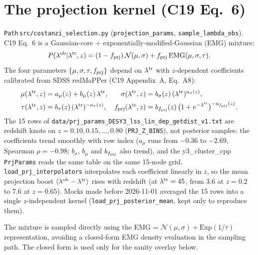 \documentclass[a4paper, 11pt]{article}
\newcommand{\lob}{\lambda^{\rm ob}}
\newcommand{\ltr}{\lambda^{\rm tr}}
\newcommand{\modname}[1]{\textcolor{kwcol}{\texttt{#1}}}
\newcommand{\pyfile}[1]{{\small\texttt{#1}}}
\begin{document}
\section{The projection kernel (C19 Eq.~6)}
\label{sec:projection}

\modname{Path}\,\pyfile{src/costanzi\_selection.py}
(\texttt{projection\_params}, \texttt{sample\_lambda\_obs}). C19 Eq.~6 is a
Gaussian-core $+$ exponentially-modified-Gaussian (EMG) mixture:
\begin{equation}
\label{eq:c19-eq6}
  P(\lob | \ltr, z)
  = (1 - f_{\rm prj})\, \mathcal N(\mu, \sigma)
       + f_{\rm prj}\, \mathrm{EMG}(\mu, \sigma, \tau).
\end{equation}
The four parameters $\{\mu, \sigma, \tau, f_{\rm prj}\}$ depend on
$\ltr$ with $z$-dependent coefficients calibrated from SDSS redMaPPer
(C19 Appendix~A, Eq.~A8):
\begin{equation}
\label{eq:c19-a8}
\begin{aligned}
  \mu(\ltr, z)         &= a_\mu(z) + b_\mu(z)\,\ltr,
  & \sigma(\ltr, z)     &= b_\sigma(z)\,(\ltr)^{a_\sigma(z)}, \\
  \tau(\ltr, z)        &= b_\tau(z)\,(\ltr)^{-a_\tau(z)},
  & f_{\rm prj}(\ltr, z)&= b_{f_{\rm prj}}(z)\,\big(1 + e^{-\ltr}\big)^{-a_{f_{\rm prj}}(z)}.
\end{aligned}
\end{equation}
The 15 rows of \pyfile{data/prj\_params\_DESY3\_lss\_lin\_dep\_getdist\_v1.txt}
are redshift knots on $z = 0.10, 0.15, \dots, 0.80$
(\texttt{PRJ\_Z\_BINS}), not posterior samples: the coefficients trend
smoothly with row index ($a_\mu$ runs from $-0.36$ to $-2.69$, Spearman
$\rho = -0.98$; $b_\sigma$, $b_\mu$ and $b_{f_{\rm prj}}$ also trend), and
the y3\_cluster\_cpp \texttt{PrjParams} reads the same table on the same
15-node grid. \texttt{load\_prj\_interpolators} interpolates each
coefficient linearly in $z$, so the mean projection boost
$\langle\lob - \ltr\rangle$ rises with redshift (at $\ltr = 45$, from 3.6
at $z = 0.2$ to 7.6 at $z = 0.65$). Mocks made before 2026-11-01 averaged
the 15 rows into a single $z$-independent kernel
(\texttt{load\_prj\_posterior\_mean}, kept only to reproduce them).

The mixture is sampled directly using the EMG = $\mathcal N(\mu,\sigma) +
\mathrm{Exp}(1/\tau)$ representation, avoiding a closed-form EMG density
evaluation in the sampling path. The closed form is used only for the
sanity overlay below.
\end{document}
